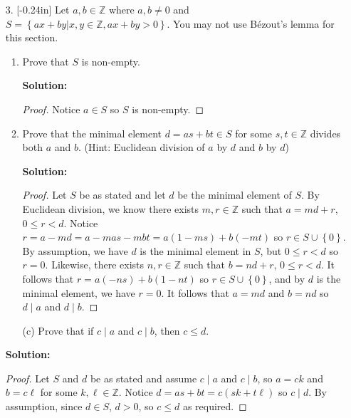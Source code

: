 \documentclass[letterpaper,12pt]{article}
\newcommand{\set}[1]{\left\{ #1 \right\}}
\theoremstyle{definition}
\begin{document}
\pagebreak
\begin{enumerate}
    \item[3. ]\reversemarginpar{}[-0.24in] Let $a,b \in \mathbb{Z}$ where $a,b \neq 0$ and $S = \set{ax + by | x,y \in \mathbb{Z}, ax + by > 0}$. You may not use Bézout's lemma for this section. \begin{enumerate}
        \item Prove that $S$ is non-empty. 
            \begin{mdframed}
                \textbf{Solution:}
                \begin{proof}
                    Notice $a \in S$ so $S$ is non-empty.
                \end{proof}
            \end{mdframed}
            \vspace{0.2in}
        \item Prove that the minimal element $d = as + bt \in S$ for some $s,t \in \mathbb{Z}$ divides both $a$ and $b$. (Hint: Euclidean division of $a$ by $d$ and $b$ by $d$)
        \begin{mdframed}
            \textbf{Solution:} \begin{proof}
                Let $S$ be as stated and let $d$ be the minimal element of $S$. By Euclidean division, we know there exists $m, r \in \mathbb{Z}$ such that $a = md + r$, $0 \leq r < d$. Notice $r = a - md = a - mas - mbt = a(1-ms) + b(-mt)$ so $r \in S \cup \set{0}$. By assumption, we have $d$ is the minimal element in $S$, but $0 \leq r < d$ so $r = 0$. Likewise, there exists $n, r \in \mathbb{Z}$ such that $b = nd + r$, $0 \leq r < d$. It follows that $r = a(-ns) + b(1-nt)$ so $r \in S \cup \set{0}$, and by $d$ is the minimal element, we have $r = 0$. It follows that $a = md$ and $b = nd$ so $d \mid a$ and $d \mid b$.
            \end{proof}
        \end{mdframed}
    \end{enumerate}
\end{enumerate}
\pagebreak
\begin{enumerate}
    \item[] \begin{enumerate}
        \item[(c)] Prove that if $c \mid a$ and $c \mid b$, then $c \leq d$.
    \end{enumerate}
    \begin{mdframed}
        \textbf{Solution:} \begin{proof}
            Let $S$ and $d$ be as stated and assume $c \mid a$ and $c \mid b$, so $a = ck$ and $b = c\ell$ for some $k,\ell \in \mathbb{Z}$. Notice $d = as + bt = c(sk + t\ell)$ so $c \mid d$. By assumption, since $d \in S$, $d > 0$, so $c \leq d$ as required.
        \end{proof}
    \end{mdframed}
\end{enumerate}
\end{document}
